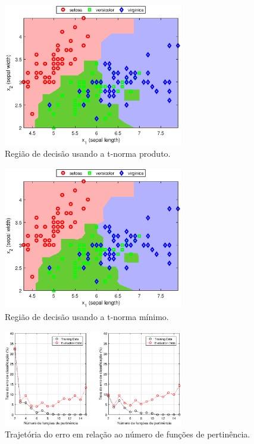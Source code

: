 \documentclass[12pt,a4paper]{article}
\numberwithin{equation}{section}
\begin{document}
\begin{figure}[ht]
\centering
\includegraphics[width=0.7\textwidth]{product.eps}
\caption{Região de decisão usando a t-norma produto.}
\label{fig:produst}
\end{figure}

\begin{figure}[ht]
\centering
\includegraphics[width=0.7\textwidth]{minimum.eps}
\caption{Região de decisão usando a t-norma mínimo.}
\label{fig:produst}
\end{figure}

\begin{figure}[ht]
\centering
\includegraphics[width=0.7\textwidth]{error.eps}
\caption{Trajetória do erro em relação ao número de funções de pertinência.}
\label{fig:produst}
\end{figure}
\end{document}
